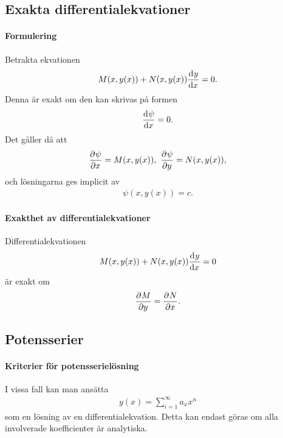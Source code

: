 





\subsection{Exakta differentialekvationer}

\paragraph{Formulering}
Betrakta ekvationen
\begin{align*}
	M(x, y(x)) + N(x, y(x))\dv[]{y}{x} (x) = 0.
\end{align*}
Denna är exakt om den kan skrivas på formen
\begin{align*}
	\dv[]{\psi}{x} (x, y(x)) = 0.
\end{align*}
Det gåller då att
\begin{align*}
	\pdv[]{\psi}{x} (x, y(x)) = M(x, y(x)),\ \pdv[]{\psi}{y} (x, y(x)) = N(x, y(x)),
\end{align*}
och lösningarna ges implicit av
\begin{align*}
	\psi(x, y(x)) = c.
\end{align*}

\paragraph{Exakthet av differentialekvationer}
Differentialekvationen
\begin{align*}
	M(x, y(x)) + N(x, y(x))\dv[]{y}{x} (x) = 0
\end{align*}
är exakt om
\begin{align*}
	\pdv[]{M}{y} (x, y(x)) = \pdv[]{N}{x} (x, y(x)).
\end{align*}

\subsection{Potensserier}

\paragraph{Kriterier för potensserielösning}
I vissa fall kan man ansätta
\begin{align*}
	y(x) = \sum\limits_{i = 1}^{\infty}a_{x}x^{n}
\end{align*}
som en lösning av en differentialekvation. Detta kan endast göras om alla involverade koefficienter är analytiska.

